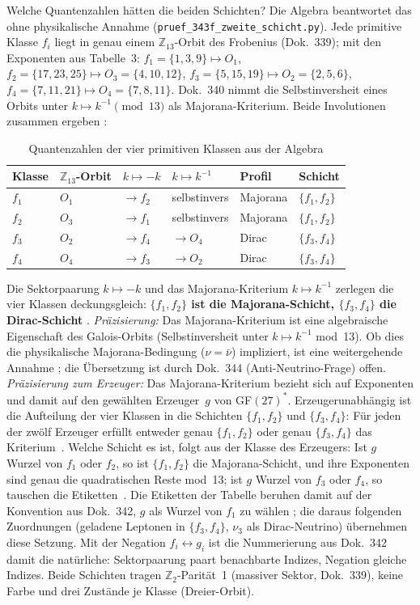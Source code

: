 Welche Quantenzahlen hätten die beiden Schichten? Die Algebra beantwortet
das ohne physikalische Annahme (\texttt{pruef\_343f\_zweite\_schicht.py}). Jede
primitive Klasse $f_i$ liegt in genau einem $\mathbb{Z}_{13}$-Orbit des
Frobenius (Dok.~339); mit den Exponenten aus Tabelle~3: $f_1=\{1,3,9\} \mapsto O_1$,
$f_2=\{17,23,25\} \mapsto O_3=\{4,10,12\}$, $f_3=\{5,15,19\} \mapsto O_2=\{2,5,6\}$,
$f_4=\{7,11,21\} \mapsto O_4=\{7,8,11\}$. Dok.~340 nimmt die
Selbstinversheit eines Orbits unter $k \mapsto k^{-1} \pmod{13}$ als
Majorana-Kriterium. Beide Involutionen zusammen ergeben \BM:

\begin{table}[H]
\centering
\caption{Quantenzahlen der vier primitiven Klassen aus der Algebra}
\begin{tabular}{llllll}
\toprule
Klasse & $\mathbb{Z}_{13}$-Orbit & $k\mapsto -k$ & $k\mapsto k^{-1}$ & Profil & Schicht \\
\midrule
$f_1$ & $O_1$ & $\to f_2$ & selbstinvers & Majorana & $\{f_1,f_2\}$ \\
$f_2$ & $O_3$ & $\to f_1$ & selbstinvers & Majorana & $\{f_1,f_2\}$ \\
$f_3$ & $O_2$ & $\to f_4$ & $\to O_4$ & Dirac & $\{f_3,f_4\}$ \\
$f_4$ & $O_4$ & $\to f_3$ & $\to O_2$ & Dirac & $\{f_3,f_4\}$ \\
\bottomrule
\end{tabular}
\end{table}

Die Sektorpaarung $k \mapsto -k$ und das Majorana-Kriterium $k \mapsto k^{-1}$
zerlegen die vier Klassen deckungsgleich: \textbf{$\{f_1,f_2\}$ ist die
Majorana-Schicht, $\{f_3,f_4\}$ die Dirac-Schicht} \BM. \textit{Präzisierung:}
Das Majorana-Kriterium ist eine algebraische Eigenschaft des Galois-Orbits
(Selbstinversheit unter $k\mapsto k^{-1}$ mod~13). Ob dies die physikalische
Majorana-Bedingung ($\nu = \bar{\nu}$) impliziert, ist eine weitergehende
Annahme \SM; die Übersetzung ist durch Dok.~344 (Anti-Neutrino-Frage) offen.
\textit{Präzisierung zum Erzeuger:} Das Majorana-Kriterium bezieht sich auf
Exponenten und damit auf den gewählten Erzeuger~$g$ von GF$(27)^*$.
Erzeugerunabhängig ist die Aufteilung der vier Klassen in die Schichten
$\{f_1,f_2\}$ und $\{f_3,f_4\}$: Für jeden der zwölf Erzeuger erfüllt entweder
genau $\{f_1,f_2\}$ oder genau $\{f_3,f_4\}$ das Kriterium \BM\,\LM. Welche
Schicht es ist, folgt aus der Klasse des Erzeugers: Ist $g$ Wurzel von $f_1$
oder $f_2$, so ist $\{f_1,f_2\}$ die Majorana-Schicht, und ihre Exponenten sind
genau die quadratischen Reste mod~13; ist $g$ Wurzel von $f_3$ oder $f_4$, so
tauschen die Etiketten \BM\,\LM. Die Etiketten der Tabelle beruhen damit auf der
Konvention aus Dok.~342, $g$ als Wurzel von $f_1$ zu wählen \SetzM; die daraus
folgenden Zuordnungen (geladene Leptonen in $\{f_3,f_4\}$, $\nu_3$ als
Dirac-Neutrino) übernehmen diese Setzung. Mit der Negation
$f_i \leftrightarrow g_i$ ist die Nummerierung aus Dok.~342 damit die natürliche:
Sektorpaarung paart benachbarte Indizes, Negation gleiche Indizes. Beide Schichten tragen
$\mathbb{Z}_2$-Parität~1 (massiver Sektor, Dok.~339), keine Farbe und drei
Zustände je Klasse (Dreier-Orbit).


